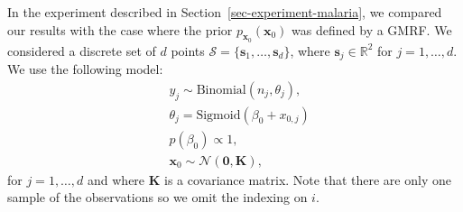 In the experiment described in Section~\ref{sec-experiment-malaria}, we compared our results with the case where the prior $p_{\mathbf{x}_{0}}(\mathbf{x}_{0})$ was defined by a GMRF. 
We considered a discrete set of $d$ points $\mathcal{S}=\{\mathbf{s}_{1},\ldots,\mathbf{s}_{d}\}$, where $\mathbf{s}_{j}\in\mathbb{R}^{2}$ for $j=1,\ldots,d$.
We use the following model:
\begin{align*}
    &y_{j} \sim \text{Binomial}(n_j, \theta_j), \\
    &\theta_j = \text{Sigmoid}(\beta_0 + x_{0,j})\\ 
    &p(\beta_0) \propto 1, \\
    &\mathbf{x}_{0} \sim \mathcal{N}(\boldsymbol{0}, \mathbf{K}),
\end{align*}
for  $j = 1, \ldots, d$ and where $\mathbf{K}$ is a covariance matrix. Note that there are only one sample of the observations so we omit the indexing on $i$.

